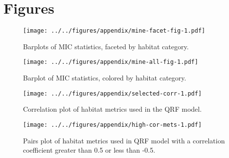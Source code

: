 \documentclass[
  12pt,
]{article}
\begin{document}
\hypertarget{figures}{%
\section{Figures}\label{figures}}

\begin{figure}
\centering
\texttt{[image: ../../figures/appendix/mine-facet-fig-1.pdf]}
\caption{\label{fig:mine-facet-fig}Barplots of MIC statistics, faceted by habitat category.}
\end{figure}

\begin{figure}
\centering
\texttt{[image: ../../figures/appendix/mine-all-fig-1.pdf]}
\caption{\label{fig:mine-all-fig}Barplot of MIC statistics, colored by habitat category.}
\end{figure}

\begin{figure}
\centering
\texttt{[image: ../../figures/appendix/selected-corr-1.pdf]}
\caption{\label{fig:selected-corr}Correlation plot of habitat metrics used in the QRF model.}
\end{figure}

\begin{figure}
\centering
\texttt{[image: ../../figures/appendix/high-cor-mets-1.pdf]}
\caption{\label{fig:high-cor-mets}Pairs plot of habitat metrics used in QRF model with a correlation coefficient greater than 0.5 or less than -0.5.}
\end{figure}
\end{document}
